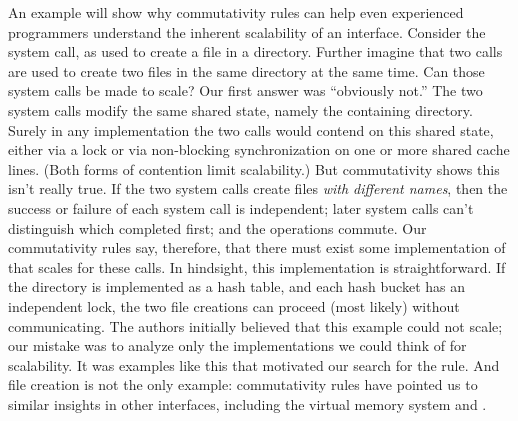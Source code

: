 An example will show why commutativity rules can help even experienced
programmers understand the inherent scalability of an interface.
%
Consider the  system call, as used to create a file in a
directory.
%
Further imagine that two  calls are used to create two
files in the same directory at the same time.
%
Can those system calls be made to scale?
%
Our first answer was ``obviously not.''
%
The two system calls modify the same shared state, namely the containing
directory.
%
Surely in any implementation the two calls would contend on this shared
state, either via a lock or via non-blocking synchronization on one or
more shared cache lines. (Both forms of contention limit scalability.)
%
But commutativity shows this isn't really true.
%
If the two system calls create files \emph{with different names}, then the
success or failure of each system call is independent; later system calls can't
distinguish which completed first; and the operations commute.
%
Our commutativity rules say, therefore, that there must exist some
implementation of  that scales for these calls.
%
In hindsight, this implementation is straightforward.
%
If the directory is implemented as a hash table, and each hash bucket has an
independent lock, the two file creations can proceed (most likely) without
communicating.
%
The authors initially believed that this example could not scale; our
mistake was to analyze only the implementations we could think of for
scalability. It was examples like this that motivated our search for
the rule.
%
And file creation is not the only example: commutativity rules have pointed us
to similar insights in other interfaces, including the virtual memory system and
.


